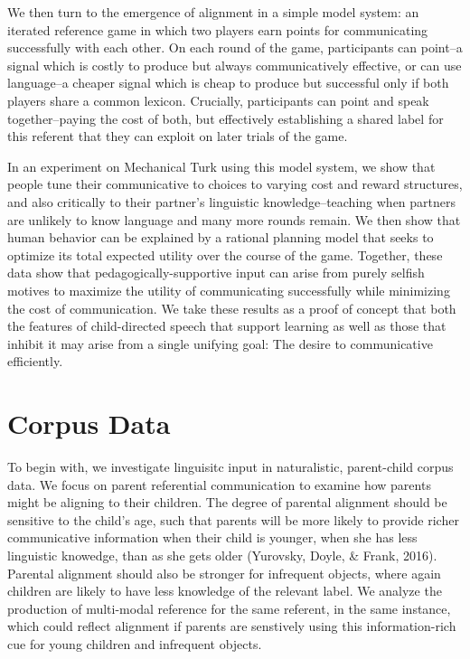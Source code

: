 \documentclass[10pt, letterpaper]{article}
\begin{document}
We then turn to the emergence of alignment in a simple model system: an
iterated reference game in which two players earn points for
communicating successfully with each other. On each round of the game,
participants can point--a signal which is costly to produce but always
communicatively effective, or can use language--a cheaper signal which
is cheap to produce but successful only if both players share a common
lexicon. Crucially, participants can point and speak together--paying
the cost of both, but effectively establishing a shared label for this
referent that they can exploit on later trials of the game.

In an experiment on Mechanical Turk using this model system, we show
that people tune their communicative to choices to varying cost and
reward structures, and also critically to their partner's linguistic
knowledge--teaching when partners are unlikely to know language and many
more rounds remain. We then show that human behavior can be explained by
a rational planning model that seeks to optimize its total expected
utility over the course of the game. Together, these data show that
pedagogically-supportive input can arise from purely selfish motives to
maximize the utility of communicating successfully while minimizing the
cost of communication. We take these results as a proof of concept that
both the features of child-directed speech that support learning as well
as those that inhibit it may arise from a single unifying goal: The
desire to communicative efficiently.

\hypertarget{corpus-data}{%
\section{Corpus Data}\label{corpus-data}}

To begin with, we investigate linguisitc input in naturalistic,
parent-child corpus data. We focus on parent referential communication
to examine how parents might be aligning to their children. The degree
of parental alignment should be sensitive to the child's age, such that
parents will be more likely to provide richer communicative information
when their child is younger, when she has less linguistic knowedge, than
as she gets older (Yurovsky, Doyle, \& Frank, 2016). Parental alignment
should also be stronger for infrequent objects, where again children are
likely to have less knowledge of the relevant label. We analyze the
production of multi-modal reference for the same referent, in the same
instance, which could reflect alignment if parents are senstively using
this information-rich cue for young children and infrequent objects.
\end{document}
